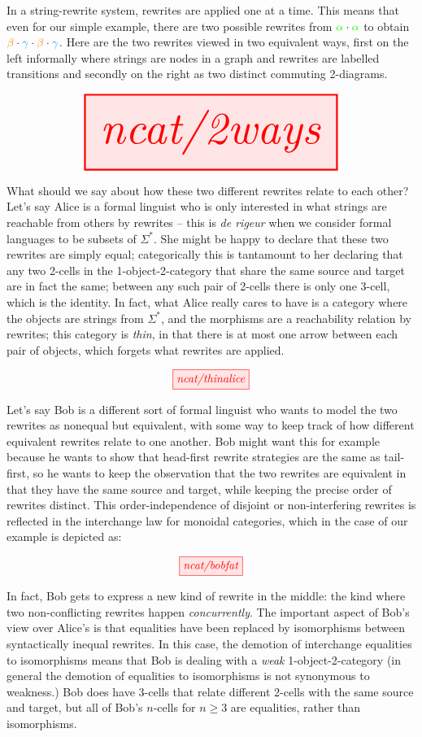  In a string-rewrite system, rewrites are applied one at a time. This means that even for our simple example, there are two possible rewrites from $\textcolor{green}{\alpha} \cdot \textcolor{green}{\alpha}$ to obtain $\textcolor{orange}{\beta} \cdot \textcolor{cyan}{\gamma} \cdot \textcolor{orange}{\beta} \cdot \textcolor{cyan}{\gamma}$. Here are the two rewrites viewed in two equivalent ways, first on the left informally where strings are nodes in a graph and rewrites are labelled transitions and secondly on the right as two distinct commuting 2-diagrams.

\[\resizebox{0.8\textwidth}{!}{\tikzfig{ncat/2ways}}\]

What should we say about how these two different rewrites relate to each other? Let's say Alice is a formal linguist who is only interested in what strings are reachable from others by rewrites -- this is \emph{de rigeur} when we consider formal languages to be subsets of $\Sigma^*$. She might be happy to declare that these two rewrites are simply equal; categorically this is tantamount to her declaring that any two 2-cells in the 1-object-2-category that share the same source and target are in fact the same; between any such pair of 2-cells there is only one 3-cell, which is the identity. In fact, what Alice really cares to have is a category where the objects are strings from $\Sigma^*$, and the morphisms are a reachability relation by rewrites; this category is \emph{thin}, in that there is at most one arrow between each pair of objects, which forgets what rewrites are applied.

\[\tikzfig{ncat/thinalice}\]

Let's say Bob is a different sort of formal linguist who wants to model the two rewrites as nonequal but equivalent, with some way to keep track of how different equivalent rewrites relate to one another. Bob might want this for example because he wants to show that head-first rewrite strategies are the same as tail-first, so he wants to keep the observation that the two rewrites are equivalent in that they have the same source and target, while keeping the precise order of rewrites distinct. This order-independence of disjoint or non-interfering rewrites is reflected in the interchange law for monoidal categories, which in the case of our example is depicted as:

\[\tikzfig{ncat/bobfat}\]

In fact, Bob gets to express a new kind of rewrite in the middle: the kind where two non-conflicting rewrites happen \emph{concurrently}. The important aspect of Bob's view over Alice's is that equalities have been replaced by isomorphisms between syntactically inequal rewrites. In this case, the demotion of interchange equalities to isomorphisms means that Bob is dealing with a \emph{weak} 1-object-2-category (in general the demotion of equalities to isomorphisms is not synonymous to weakness.) Bob does have 3-cells that relate different 2-cells with the same source and target, but all of Bob's $n$-cells for $n \geq 3$ are equalities, rather than isomorphisms.


